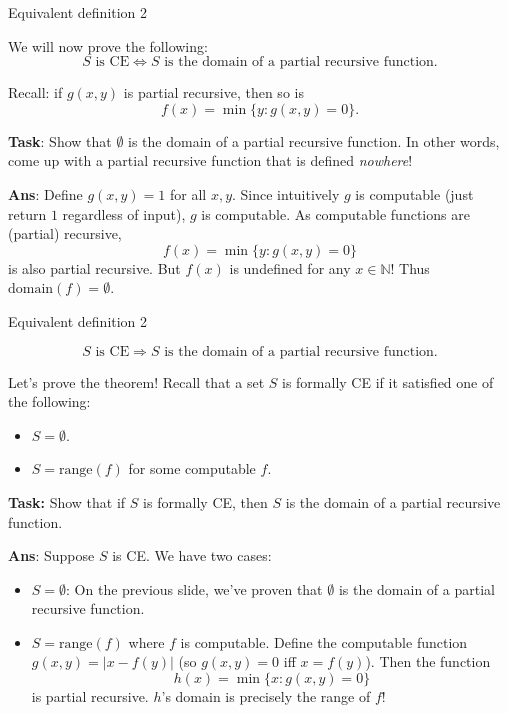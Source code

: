 \documentclass{beamer}
\newcommand{\N}{\mathbb N}
\begin{document}
\begin{frame}{Equivalent definition 2}

We will now prove the following:
$$\text{$S$ is CE} \Leftrightarrow \text{$S$ is the domain of a partial recursive function}.$$

Recall: if $g(x, y)$ is partial recursive, then so is
$$f(x) = \min\{y: g(x, y) = 0\}.$$

\pause

\textbf{Task}: Show that $\emptyset$ is the domain of a partial recursive function. In other words, come up with a partial recursive function that is defined \textit{nowhere}!

\pause

\textbf{Ans}: Define $g(x, y) = 1$ for all $x, y$. Since intuitively $g$ is computable (just return $1$ regardless of input), $g$ is computable. As computable functions are (partial) recursive,
$$f(x) = \min\{y: g(x, y) = 0\}$$
is also partial recursive. But $f(x)$ is undefined for any $x \in \N$! Thus $\text{domain}(f) = \emptyset$.

\end{frame}


\begin{frame}{Equivalent definition 2}

$$\text{$S$ is CE} \Rightarrow \text{$S$ is the domain of a partial recursive function}.$$

Let's prove the theorem! Recall that a set $S$ is formally CE if it satisfied one of the following:
\begin{itemize}
    \item $S = \emptyset$.
    \item $S = \text{range}(f)$ for some computable $f$.
\end{itemize}

\textbf{Task:} Show that if $S$ is formally CE, then $S$ is the domain of a partial recursive function.

\pause

\textbf{Ans}: Suppose $S$ is CE. We have two cases:
\begin{itemize}
    \item $S = \emptyset$: On the previous slide, we've proven that $\emptyset$ is the domain of a partial recursive function.
    \item $S = \text{range}(f)$ where $f$ is computable. Define the computable function $g(x, y) = |x - f(y)|$ (so $g(x, y) = 0$ iff $x = f(y)$). Then the function
    $$h(x) = \min\{x: g(x, y) = 0\}$$
    is partial recursive. $h$'s domain is precisely the range of $f$!
\end{itemize}

\end{frame}
\end{document}
